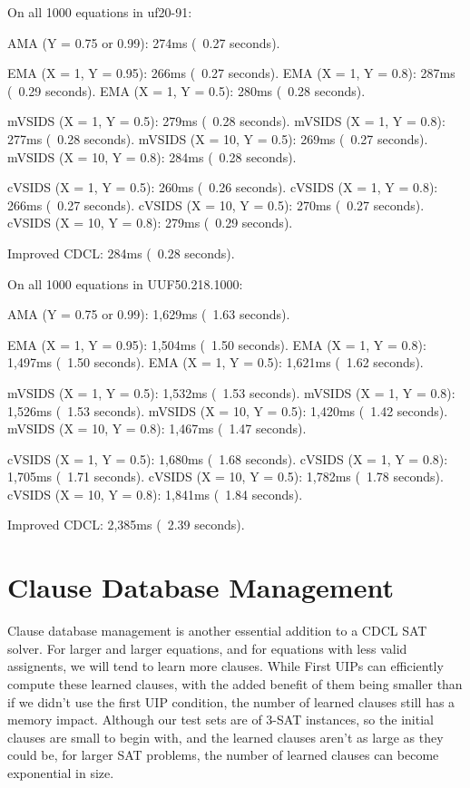 \documentclass[../main.tex]{subfiles}
\begin{document}
\begin{FVerbatim}
On all 1000 equations in uf20-91:

AMA (Y = 0.75 or 0.99):     274ms (~0.27 seconds).

EMA (X = 1, Y = 0.95):      266ms (~0.27 seconds).
EMA (X = 1, Y = 0.8):       287ms (~0.29 seconds).
EMA (X = 1, Y = 0.5):       280ms (~0.28 seconds).

mVSIDS (X = 1, Y = 0.5):    279ms (~0.28 seconds).
mVSIDS (X = 1, Y = 0.8):    277ms (~0.28 seconds).
mVSIDS (X = 10, Y = 0.5):   269ms (~0.27 seconds).
mVSIDS (X = 10, Y = 0.8):   284ms (~0.28 seconds).

cVSIDS (X = 1, Y = 0.5):    260ms (~0.26 seconds).
cVSIDS (X = 1, Y = 0.8):    266ms (~0.27 seconds).
cVSIDS (X = 10, Y = 0.5):   270ms (~0.27 seconds).
cVSIDS (X = 10, Y = 0.8):   279ms (~0.29 seconds).

Improved CDCL:              284ms (~0.28 seconds).

On all 1000 equations in UUF50.218.1000:

AMA (Y = 0.75 or 0.99):     1,629ms (~1.63 seconds).

EMA (X = 1, Y = 0.95):      1,504ms (~1.50 seconds).
EMA (X = 1, Y = 0.8):       1,497ms (~1.50 seconds).
EMA (X = 1, Y = 0.5):       1,621ms (~1.62 seconds).

mVSIDS (X = 1, Y = 0.5):    1,532ms (~1.53 seconds).
mVSIDS (X = 1, Y = 0.8):    1,526ms (~1.53 seconds).
mVSIDS (X = 10, Y = 0.5):   1,420ms (~1.42 seconds).
mVSIDS (X = 10, Y = 0.8):   1,467ms (~1.47 seconds).

cVSIDS (X = 1, Y = 0.5):    1,680ms (~1.68 seconds).
cVSIDS (X = 1, Y = 0.8):    1,705ms (~1.71 seconds).
cVSIDS (X = 10, Y = 0.5):   1,782ms (~1.78 seconds).
cVSIDS (X = 10, Y = 0.8):   1,841ms (~1.84 seconds).

Improved CDCL:              2,385ms (~2.39 seconds).
\end{FVerbatim}
\noindent

\section{Clause Database Management}

Clause database management is another essential addition to a CDCL SAT solver. 
For larger and larger equations, and for equations with less valid assignents, 
we will tend to learn more clauses. While First UIPs can efficiently compute 
these learned clauses, with the added benefit of them being smaller than if we 
didn't use the first UIP condition, the number of learned clauses still has a 
memory impact. Although our test sets are of 3-SAT instances, so the initial 
clauses are small to begin with, and the learned clauses aren't as large as they 
could be, for larger SAT problems, the number of learned clauses can become exponential
in size. 
\end{document}
